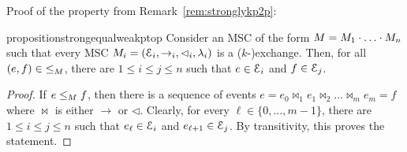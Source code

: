 Proof of the property from Remark~\ref{rem:stronglykp2p}:
\begin{restatable}{proposition}{strongequalweakptop}
\label{proposition:strong_equal_weak_p2p}
Consider an MSC of the form
$M = M_1 \cdot \ldots \cdot M_n$ %
such that every MSC $M_i = (\mathcal{E}_i,\to_i,\lhd_i,\lambda_i)$ is a ($k$-)exchange.
Then, for all $(e,f) \in {\le}_M$, there are $1 \le i \le j \le n$
such that $e \in \mathcal{E}_i$ and $f \in \mathcal{E}_j$.
\end{restatable}

\begin{proof}
%
If $e \le_M f$, then there is a sequence of events $e = e_0 \bowtie_1 e_1 \bowtie_2 \ldots
\bowtie_m e_m = f$ where $\bowtie$ is either $\to$ or $\lhd$. Clearly, for every
$\ell \in \{0,\ldots,m-1\}$, there are $1 \le i \le j \le n$
such that $e_\ell \in \mathcal{E}_i$ and $e_{\ell+1} \in \mathcal{E}_j$.
By transitivity, this proves the statement.
\qedhere
\end{proof}
